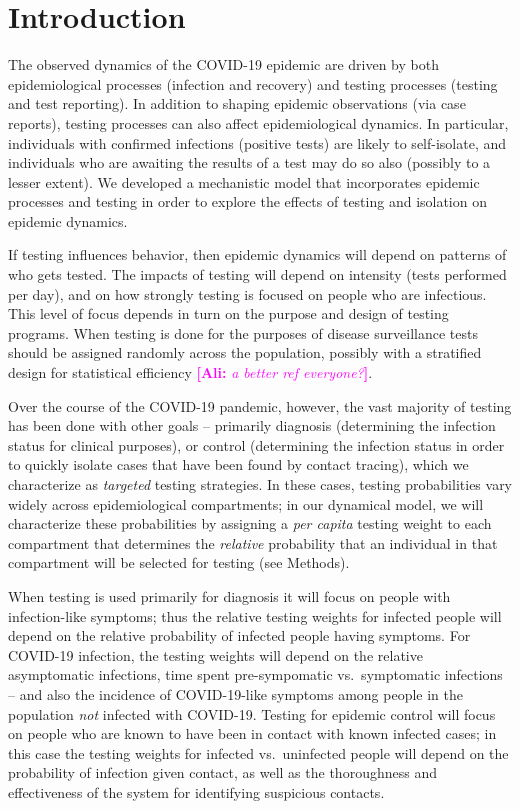 \documentclass[12pt]{article}
\newcommand{\percap}{\emph{per capita}\xspace}
\newcommand{\covid}{COVID-19\xspace}
\DeclareRobustCommand\_{\ifmmode\expandafter\subtxt\else\textunderscore\fi}
\newcommand{\comment}{\showcomment}
\newcommand{\showcomment}[3]{\textcolor{#1}{\textbf{[#2: }\textsl{#3}\textbf{]}}}
\newcommand{\ali}[1]{\comment{magenta}{Ali}{#1}}
\theoremstyle{definition} %
\begin{document}
\section{Introduction}

The observed dynamics of the \covid epidemic are driven by both epidemiological processes (infection and recovery) and testing processes (testing and test reporting). In addition to shaping epidemic observations (via case reports), testing processes can also affect epidemiological dynamics. In particular, individuals with confirmed infections (positive tests) are likely to self-isolate, and individuals who are awaiting the results of a test may do so also (possibly to a lesser extent). We developed a mechanistic model that incorporates epidemic processes and testing in order to explore the effects of testing and isolation on epidemic dynamics.

If testing influences behavior, then epidemic dynamics will depend on patterns of who gets tested.
The impacts of testing will depend on intensity (tests performed per day), and on how strongly testing is focused on people who are infectious.
This level of focus depends in turn on the purpose and design of testing programs. 
When testing is done for the purposes of disease surveillance \citep{foddai2020base}
tests should be assigned randomly across the population, possibly with a stratified design for statistical efficiency \citep{graubard1996modelling} \ali{a better ref everyone?}. 

Over the course of the \covid pandemic, however, the vast majority of testing has been done with other goals --
primarily diagnosis (determining the infection status for clinical purposes), or control (determining the infection status in order to quickly isolate cases that have been found by contact tracing), which we characterize as \emph{targeted} testing strategies.
In these cases, testing probabilities vary widely across epidemiological compartments; in our dynamical model, we will characterize these probabilities by assigning a \percap testing weight to each compartment that determines the \emph{relative} probability that an individual in that compartment will be selected for testing (see Methods). 

When testing is used primarily for diagnosis it will focus on people with infection-like symptoms; thus the relative testing weights for infected people will depend on the relative probability of infected people having symptoms. For \covid infection, the testing weights will depend on the relative asymptomatic infections, time spent pre-sympomatic vs.\ symptomatic infections -- and also the incidence of \covid-like symptoms among people in the population \emph{not} infected with \covid. Testing for epidemic control will focus on people who are known to have been in contact with known infected cases; in this case the testing weights for infected vs.\ uninfected people will depend on the probability of infection given contact, as well as the thoroughness and effectiveness of the system for identifying suspicious contacts.
\end{document}
